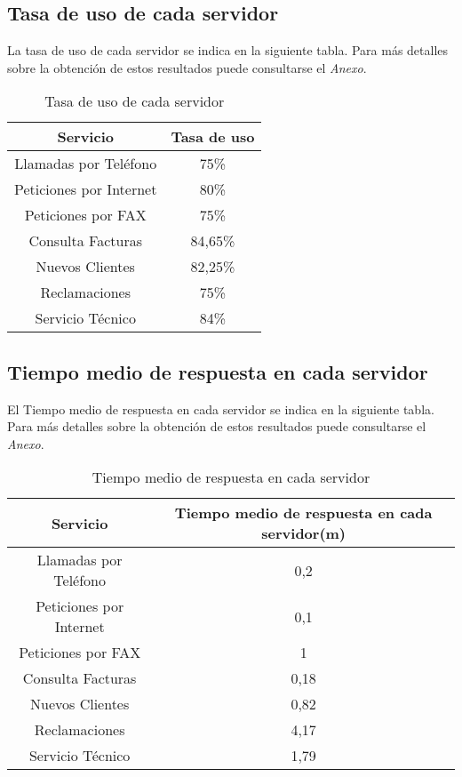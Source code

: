 \subsection{Tasa de uso de cada servidor}
La tasa de uso de cada servidor se indica en la siguiente tabla. Para más detalles sobre la obtención de estos resultados puede consultarse el \textit{Anexo}.\\
\begin{table}[H]
  \begin{center}
  \begin{tabular}{|c|c|}
    \hline
    \textbf{Servicio}       & \textbf{Tasa de uso} \\ \hline
    Llamadas por Teléfono   & 75\%                   \\ \hline
    Peticiones por Internet & 80\%                  \\ \hline
    Peticiones por FAX      & 75\%                   \\ \hline
    Consulta Facturas      & 84,65\%                   \\ \hline
    Nuevos Clientes      & 82,25\%                   \\ \hline
    Reclamaciones      & 75\%                   \\ \hline
    Servicio Técnico      & 84\%                  \\ \hline
  \end{tabular}
\end{center}
  \caption{Tasa de uso de cada servidor}
  \end{table}
\subsection{Tiempo medio de respuesta en cada servidor}
El Tiempo medio de respuesta en cada servidor se indica en la siguiente tabla. Para más detalles sobre la obtención de estos resultados puede consultarse el \textit{Anexo}.\\
\begin{table}[H]
  \begin{center}
  \begin{tabular}{|c|c|}
    \hline
    \textbf{Servicio}       & \textbf{Tiempo medio de respuesta en cada servidor(m)} \\ \hline
    Llamadas por Teléfono   & 0,2                   \\ \hline
    Peticiones por Internet & 0,1                  \\ \hline
    Peticiones por FAX      & 1                   \\ \hline
    Consulta Facturas      & 0,18                   \\ \hline
    Nuevos Clientes      & 0,82                   \\ \hline
    Reclamaciones      & 4,17                   \\ \hline
    Servicio Técnico      & 1,79                   \\ \hline
  \end{tabular}
\end{center}
  \caption{Tiempo medio de respuesta en cada servidor}
  \end{table}
